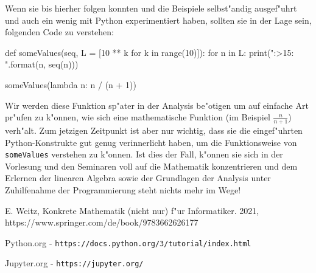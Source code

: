 \documentclass{article}
\begin{document}
Wenn sie bis hierher folgen konnten und die Beispiele selbst"andig ausgef"uhrt und auch ein wenig mit Python experimentiert haben, sollten sie in der Lage sein, folgenden Code zu verstehen:
\begin{python}
def someValues(seq, L = [10 ** k for k in range(10)]):
    for n in L:
        print("{:>15}: {}".format(n, seq(n)))
        
someValues(lambda n: n / (n + 1))
\end{python}
Wir werden diese Funktion sp"ater in der Analysis be"otigen um auf einfache Art pr"ufen zu k"onnen, wie sich eine mathematische Funktion (im Beispiel $\frac{n}{n +1}$) \glqq verh"alt\grqq{}. Zum jetzigen Zeitpunkt ist aber nur wichtig, dass sie die eingef"uhrten Python-Konstrukte gut genug verinnerlicht haben, um die Funktionsweise von \verb+someValues+ verstehen zu k"onnen. Ist dies der Fall, k"onnen sie sich in der Vorlesung und den Seminaren voll auf die Mathematik konzentrieren und dem Erlernen der linearen Algebra sowie der Grundlagen der Analysis unter Zuhilfenahme der Programmierung steht nichts mehr im Wege!
\begin{thebibliography}{9}
E. Weitz, Konkrete Mathematik (nicht nur) f"ur Informatiker. 2021, https://www.springer.com/de/book/9783662626177

Python.org - \texttt{https://docs.python.org/3/tutorial/index.html}

Jupyter.org - \texttt{https://jupyter.org/}

\end{thebibliography}
\end{document}
